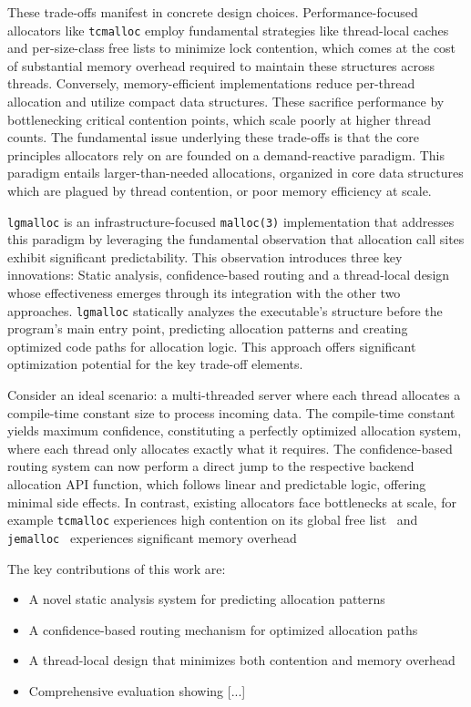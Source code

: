 \documentclass[sigconf,authordraft]{acmart}
\begin{document}
These trade-offs manifest in concrete design choices. Performance-focused allocators
like \texttt{tcmalloc} employ fundamental strategies like thread-local caches
and per-size-class free lists to minimize lock contention, which comes at the cost of
substantial memory overhead required to maintain these structures across threads.
Conversely, memory-efficient implementations reduce per-thread allocation and
utilize compact data structures. These sacrifice performance by bottlenecking
critical contention points, which scale poorly at higher thread counts.
The fundamental issue underlying these trade-offs is that the core principles
allocators rely on are founded on a demand-reactive paradigm. This paradigm
entails larger-than-needed allocations, organized in core data structures which
are plagued by thread contention, or poor memory efficiency at scale.

\texttt{lgmalloc} is an infrastructure-focused \texttt{malloc(3)} implementation that
addresses this paradigm by leveraging the fundamental observation
that allocation call sites exhibit significant predictability. This observation
introduces three key innovations: Static analysis, confidence-based routing and
a thread-local design whose effectiveness emerges through its integration with
the other two approaches. \texttt{lgmalloc} statically analyzes the executable's
structure before the program's main entry point, predicting allocation patterns
and creating optimized code paths for allocation logic. This approach offers
significant optimization potential for the key trade-off elements.

Consider an ideal scenario: a multi-threaded server where each thread allocates
a compile-time constant size to process incoming data. The compile-time constant
yields maximum confidence, constituting a perfectly optimized allocation system, 
where each thread only allocates exactly what it requires. The confidence-based
routing system can now perform a direct jump to the respective backend allocation
API function, which follows linear and predictable logic, offering minimal side effects.
In contrast, existing allocators face bottlenecks at scale, for example \texttt{tcmalloc}
experiences high contention on its global free list~\cite{Lee:2014:TCMallocPerformance}
and \texttt{jemalloc}~\cite{jemalloc2006} experiences significant memory overhead~\cite{Matias:2011:ComparativeStudy}

The key contributions of this work are:
\begin{itemize}[nosep]
  \item A novel static analysis system for predicting allocation patterns
  \item A confidence-based routing mechanism for optimized allocation paths
  \item A thread-local design that minimizes both contention and memory overhead
  \item Comprehensive evaluation showing [...] %
\end{itemize}
\end{document}
